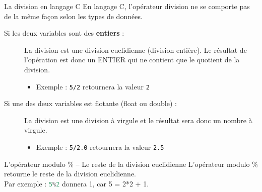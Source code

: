 \begin{UPSTIinfor}{La division en langage C}
    \label{info:division}
    En langage C, l'opérateur division ne se comporte pas de la même façon selon les types de données.
    \begin{description}
        \item[Si les deux variables sont des \textbf{entiers} : ] La division est une division euclidienne (division entière). Le résultat de l'opération est donc un ENTIER qui ne contient que le quotient de la division.
              \begin{itemize}
                  \item Exemple : \verb|5/2| retournera la valeur \verb|2|
              \end{itemize}
        \item[Si une des deux variables est flotante (float ou double) : ] La division est une division à virgule et le résultat sera donc un nombre à virgule.
              \begin{itemize}
                  \item Exemple : \verb|5/2.0| retournera la valeur \verb|2.5|
              \end{itemize}
    \end{description}
\end{UPSTIinfor}

\begin{UPSTIinfor}{L'opérateur modulo \% -- Le reste de la division euclidienne}
L'opérateur modulo \% retourne le reste de la division euclidienne. \\Par exemple : \lstinline[language=c]{5%2} donnera 1, car 5 = 2*2 + 1.
\end{UPSTIinfor}
